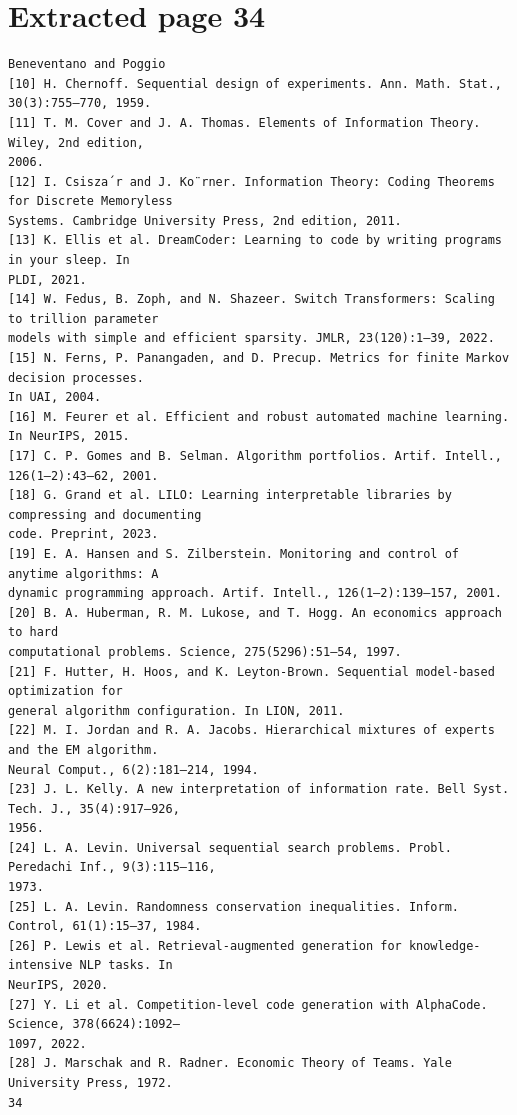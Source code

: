 \documentclass[11pt]{article}
\begin{document}
\section*{Extracted page 34}
\begin{verbatim}
Beneventano and Poggio
[10] H. Chernoff. Sequential design of experiments. Ann. Math. Stat., 30(3):755–770, 1959.
[11] T. M. Cover and J. A. Thomas. Elements of Information Theory. Wiley, 2nd edition,
2006.
[12] I. Csisza´r and J. Ko¨rner. Information Theory: Coding Theorems for Discrete Memoryless
Systems. Cambridge University Press, 2nd edition, 2011.
[13] K. Ellis et al. DreamCoder: Learning to code by writing programs in your sleep. In
PLDI, 2021.
[14] W. Fedus, B. Zoph, and N. Shazeer. Switch Transformers: Scaling to trillion parameter
models with simple and efficient sparsity. JMLR, 23(120):1–39, 2022.
[15] N. Ferns, P. Panangaden, and D. Precup. Metrics for finite Markov decision processes.
In UAI, 2004.
[16] M. Feurer et al. Efficient and robust automated machine learning. In NeurIPS, 2015.
[17] C. P. Gomes and B. Selman. Algorithm portfolios. Artif. Intell., 126(1–2):43–62, 2001.
[18] G. Grand et al. LILO: Learning interpretable libraries by compressing and documenting
code. Preprint, 2023.
[19] E. A. Hansen and S. Zilberstein. Monitoring and control of anytime algorithms: A
dynamic programming approach. Artif. Intell., 126(1–2):139–157, 2001.
[20] B. A. Huberman, R. M. Lukose, and T. Hogg. An economics approach to hard
computational problems. Science, 275(5296):51–54, 1997.
[21] F. Hutter, H. Hoos, and K. Leyton-Brown. Sequential model-based optimization for
general algorithm configuration. In LION, 2011.
[22] M. I. Jordan and R. A. Jacobs. Hierarchical mixtures of experts and the EM algorithm.
Neural Comput., 6(2):181–214, 1994.
[23] J. L. Kelly. A new interpretation of information rate. Bell Syst. Tech. J., 35(4):917–926,
1956.
[24] L. A. Levin. Universal sequential search problems. Probl. Peredachi Inf., 9(3):115–116,
1973.
[25] L. A. Levin. Randomness conservation inequalities. Inform. Control, 61(1):15–37, 1984.
[26] P. Lewis et al. Retrieval-augmented generation for knowledge-intensive NLP tasks. In
NeurIPS, 2020.
[27] Y. Li et al. Competition-level code generation with AlphaCode. Science, 378(6624):1092–
1097, 2022.
[28] J. Marschak and R. Radner. Economic Theory of Teams. Yale University Press, 1972.
34
\end{verbatim}

\clearpage
\end{document}
